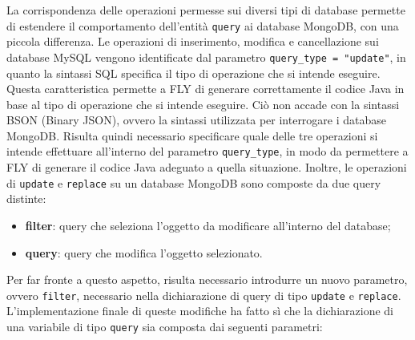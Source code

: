 La corrispondenza delle operazioni permesse sui diversi tipi di database permette di estendere il comportamento dell'entità \verb|query| ai database MongoDB, con una piccola differenza. Le operazioni di inserimento, modifica e cancellazione sui database MySQL vengono identificate dal parametro \verb|query_type = "update"|, in quanto la sintassi SQL specifica il tipo di operazione che si intende eseguire. Questa caratteristica permette a FLY di generare correttamente il codice Java in base al tipo di operazione che si intende eseguire. Ciò non accade con la sintassi BSON (Binary JSON), ovvero la sintassi utilizzata per interrogare i database MongoDB. Risulta quindi necessario specificare quale delle tre operazioni si intende effettuare all'interno del parametro \verb|query_type|, in modo da permettere a FLY di generare il codice Java adeguato a quella situazione. Inoltre, le operazioni di \verb|update| e \verb|replace| su un database MongoDB sono composte da due query distinte:
\begin{itemize}
    \item \textbf{filter}: query che seleziona l'oggetto da modificare all'interno del database;
    \item \textbf{query}: query che modifica l'oggetto selezionato.
\end{itemize}
Per far fronte a questo aspetto, risulta necessario introdurre un nuovo parametro, ovvero \verb|filter|, necessario nella dichiarazione di query di tipo \verb|update| e \verb|replace|. \\
L'implementazione finale di queste modifiche ha fatto sì che la dichiarazione di una variabile di tipo \verb|query| sia composta dai seguenti parametri:
